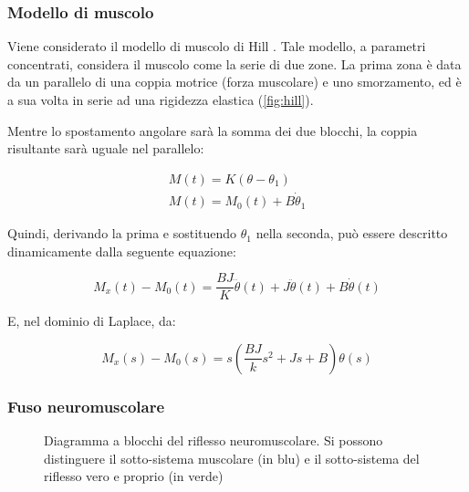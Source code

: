 \subsubsection{Modello di muscolo}

Viene considerato il modello di muscolo di Hill \cite{hill_heat_1938}. Tale modello, a parametri concentrati, considera il muscolo come la serie di due zone. La prima zona è data da un parallelo di una coppia motrice (forza muscolare) e uno smorzamento, ed è a sua volta in serie ad una rigidezza elastica (\cref{fig:hill}).

Mentre lo spostamento angolare sarà la somma dei due blocchi, la coppia risultante sarà uguale nel parallelo:

\begin{equation}
	\begin{gathered}
		M(t)=K\left(\theta-\theta_{1}\right) \\
		M(t)=M_{0}(t)+B \dot{\theta}_{1}
	\end{gathered}
\end{equation}

Quindi, derivando la prima e sostituendo $\theta_1$ nella seconda, può essere descritto dinamicamente dalla seguente equazione:

\begin{equation}
	M_{x}(t)-M_{0}(t)=\frac{B J}{K} \dddot{\theta}(t)+J \ddot{\theta}(t)+B \dot{\theta}(t)
\end{equation}

E, nel dominio di Laplace, da:

\begin{equation}
	M_{x}(s)-M_{0}(s)=s\left(\frac{B J}{k} s^{2}+J s+B\right)\theta (s)
\end{equation}

\subsubsection{Fuso neuromuscolare}

\begin{figure}[t!]
	\centering
	\footnotesize{\def\svgwidth{0.95\linewidth}
		}
	\caption{Diagramma a blocchi del riflesso neuromuscolare. Si possono distinguere il sotto-sistema muscolare (in blu) e il sotto-sistema del riflesso vero e proprio (in verde)}
	\label{fig:sistemamuscolo}
\end{figure}

